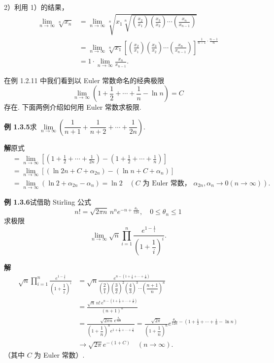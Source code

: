 \documentclass[UTF8, 12pt, fontset=fandol, oneside]{ctexart}
\begin{document}
2）利用 1）的结果，
\[
\begin{aligned}
\lim_{n\to\infty}\sqrt[n]{x_n}
&=\lim_{n\to\infty}\sqrt[n]{x_1\sqrt[n]{\left(\frac{x_2}{x_1}\right)\left(\frac{x_3}{x_2}\right)\cdots\left(\frac{x_n}{x_{n-1}}\right)}}\\
&=\lim_{n\to\infty}\sqrt[n]{x_1}
\left[\left(\frac{x_2}{x_1}\right)\left(\frac{x_3}{x_2}\right)\cdots\left(\frac{x_n}{x_{n-1}}\right)\right]^{\frac1{n-1}\cdot\frac{n-1}{n}}\\
&=1\cdot\lim_{n\to\infty}\frac{x_n}{x_{n-1}}.
\end{aligned}
\]

在例 1.2.11 中我们看到以 Euler 常数命名的经典极限
\[
  \lim_{n\to\infty}\left(1+\frac12+\cdots+\frac1n-\ln n\right)=C
\]
存在. 下面两例介绍如何用 Euler 常数求极限.

\noindent\textbf{例 1.3.5}\quad 求 $\lim\limits_{n\to\infty}\left(\dfrac1{n+1}+\dfrac1{n+2}+\cdots+\dfrac1{2n}\right)$.

\noindent\textbf{解}\quad 原式
\[
\begin{aligned}
&=\lim_{n\to\infty}\left[\left(1+\frac12+\cdots+\frac1{2n}\right)
-\left(1+\frac12+\cdots+\frac1n\right)\right]\\
&=\lim_{n\to\infty}\left[(\ln 2n+C+\alpha_{2n})-(\ln n+C+\alpha_n)\right]\\
&=\lim_{n\to\infty}(\ln2+\alpha_{2n}-\alpha_n)=\ln2
\quad(C\text{ 为 Euler 常数， }\alpha_{2n},\alpha_n\to0(n\to\infty)).
\end{aligned}
\]

\noindent\textbf{例 1.3.6}\quad 试借助 Stirling 公式
\[
  n!=\sqrt{2\pi n}\,n^ne^{-n+\frac{\theta_n}{12n}},\quad 0\le\theta_n\le1
\]
求极限
\[
  \lim_{n\to\infty}\sqrt n\prod_{i=1}^n
  \frac{e^{1-\frac1i}}{\left(1+\dfrac1i\right)^i}.
\]

\noindent\textbf{解}\quad
\[
\begin{aligned}
\sqrt n\prod_{i=1}^n\frac{e^{1-\frac1i}}{\left(1+\dfrac1i\right)^i}
&=\sqrt n\frac{e^{n-(1+\frac12+\cdots+\frac1n)}}
{\left(\dfrac21\right)\left(\dfrac32\right)^2\left(\dfrac43\right)^3\cdots\left(\dfrac{n+1}{n}\right)^n}\\
&=\frac{\sqrt n\,n!\,e^{n-(1+\frac12+\cdots+\frac1n)}}{(n+1)^n}\\
&=\frac{\sqrt{2\pi n}\,e^{\frac{\theta_n}{12n}}}
{\left(1+\dfrac1n\right)^n e^{1+\frac12+\cdots+\frac1n}}
=\frac{\sqrt{2\pi}}{\left(1+\dfrac1n\right)^n}e^{\frac{\theta_n}{12n}-\left(1+\frac12+\cdots+\frac1n-\ln n\right)}\\
&\to \sqrt{2\pi}e^{-(1+C)}\quad(n\to\infty).
\end{aligned}
\]
（其中 $C$ 为 Euler 常数）.
\end{document}
